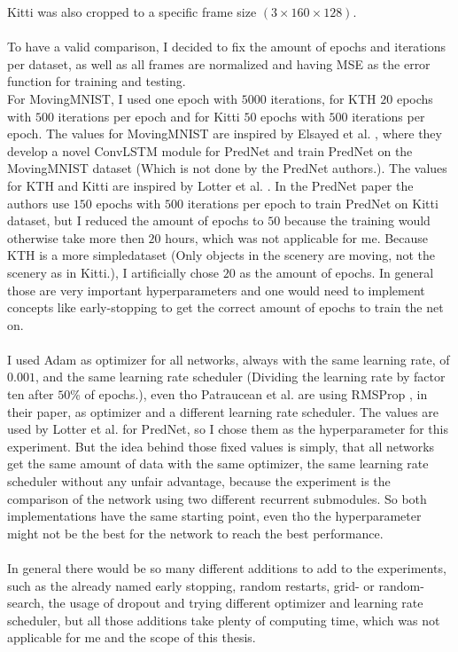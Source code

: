   Kitti was also cropped to a specific frame size $(3 \times 160 \times 128)$.\\\\
  To have a valid comparison, I decided to fix the amount of epochs and iterations per dataset, as well as all frames are normalized and having MSE as the
  error function for training and testing.\\
  For MovingMNIST, I used one epoch with $5000$ iterations, for KTH $20$ epochs with $500$ iterations per epoch and for Kitti $50$ epochs with $500$ iterations
  per epoch. The values for MovingMNIST are inspired by Elsayed et al. \cite{Elsayed2018}, where they develop a novel ConvLSTM module for PredNet and train
  PredNet on the MovingMNIST dataset (Which is not done by the PredNet authors.). The values for KTH and Kitti are inspired by Lotter et al. \cite{Lotter2016}.
  In the PredNet paper the authors use $150$ epochs with $500$ iterations per epoch to train PredNet on Kitti dataset, but I reduced the amount of epochs to
  $50$ because the training would otherwise take more then $20$ hours, which was not applicable for me. Because KTH is a more \glqq simple\grqq dataset (Only 
  objects in the scenery are moving, not the scenery as in Kitti.), I artificially chose $20$ as the amount of epochs. In general those are very important
  hyperparameters and one would need to implement concepts like early-stopping to get the correct amount of epochs to train the net on.\\\\
  I used Adam \cite{Kingma2015} as optimizer for all networks, always with the same learning rate, of $0.001$, and the same learning rate scheduler (Dividing the 
  learning rate by factor ten after $50$\% of epochs.), even tho 
  Patraucean et al. \cite{Patraucean2015} are using RMSProp \cite{Ruder2016}, in their paper, as optimizer and a different learning rate scheduler.
  The values are used by Lotter et al. \cite{Lotter2016} for PredNet, so I chose them as the hyperparameter for this experiment.
  But the idea behind those fixed values is simply, that all networks get the same amount of data with the same optimizer, the same learning rate scheduler 
  without any unfair advantage, because the experiment is the comparison of the network using two different recurrent submodules. So both implementations
  have the same starting point, even tho the hyperparameter might not be the best for the network to reach the best performance.\\\\
  In general there would be so many different additions to add to the experiments, such as the already named early stopping, random restarts, grid- or random-
  search, the usage of dropout and trying different optimizer and learning rate scheduler, but all those additions take plenty of computing time, which was not 
  applicable for me and the scope of this thesis.
  
